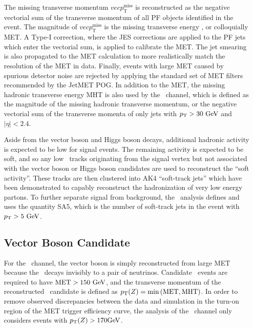 The missing transverse momentum $vec{p}_{\mathrm{T}}^{\mathrm{miss}}$ is reconstructed as the negative vectorial sum of the transverse momentum of all PF objects identified in the event. The magnitude of $vec{p}_{\mathrm{T}}^{\mathrm{miss}}$ is the missing transverse energy \pTmiss, or colloquially MET. A Type-I correction, where the JES corrections are applied to the PF jets which enter the vectorial sum, is applied to calibrate the MET. The jet smearing is also propagated to the MET calculation to more realistically match the resolution of the MET in data. Finally, events with large MET caused by spurious detector noise are rejected by applying the standard set of MET filters recommended by the JetMET POG. In addition to the MET, the missing hadronic transverse energy MHT is also used by the \ZnnH\ channel, which is defined as the magnitude of the missing hadronic transverse momentum, or the negative vectorial sum of the transverse momenta of only jets with $\pT > 30\ \GeV$ and $\left| \eta \right| < 2.4$.

Aside from the vector boson and Higgs boson decays, additional hadronic activity is expected to be low for signal events. The remaining activity is expected to be soft, and so any low \pT\ tracks originating from the signal vertex but not associated with the vector boson or Higgs boson candidates are used to reconstruct the ``soft activity''. These tracks are then clustered into AK4 ``soft-track jets'' which have been demonstrated to capably reconstruct the hadronization of very low energy partons.\cite{CMSTRACKJETS} To further separate signal from background, the \VHbb\ analysis defines and uses the quantity SA5, which is the number of soft-track jets in the event with $p_{\mathrm{T}} > 5\ \mathrm{GeV}$.

\subsection{Vector Boson Candidate}

For the \ZnnH\ channel, the vector boson is simply reconstructed from large MET because the \bosZ\ decays invisibly to a pair of neutrinos. Candidate \ZnnH\ events are required to have $\mathrm{MET} > 150\ \mathrm{GeV}$, and the transverse momentum of the reconstructed \bosZ\ candidate is defined as $p_{\mathrm{T}}(Z) = \min \left( \mathrm{MET}, \mathrm{MHT} \right)$. In order to remove observed discrepancies between the data and simulation in the turn-on region of the MET trigger efficiency curve, the analysis of the \ZnnH\ channel only considers events with $p_{\mathrm{T}}(Z) > 170 \mathrm{GeV}$.

